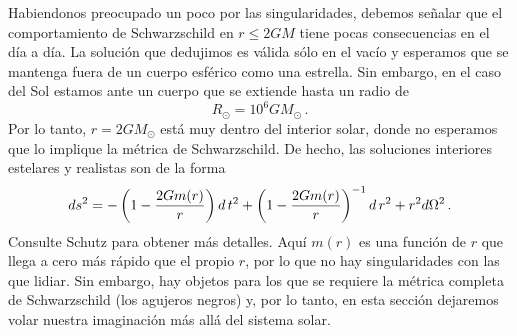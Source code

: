 \documentclass[11pt,b5paper,openany,twoside]{book}
\begin{document}
Habiendonos preocupado un poco por las singularidades, debemos señalar que el comportamiento de Schwarzschild en $r\leq 2GM$ tiene pocas consecuencias en el día a día.
La solución que dedujimos es válida sólo en el vacío y esperamos que se mantenga fuera de un cuerpo esférico como una estrella.
Sin embargo, en el caso del Sol estamos ante un cuerpo que se extiende hasta un radio de
\begin{equation}
R_\odot = 10^6 G M_\odot\,.\label{7.31}
\end{equation}
Por lo tanto, $r=2GM_\odot$ está muy dentro del interior solar, donde no esperamos que lo implique la métrica de Schwarzschild.
De hecho, las soluciones interiores estelares y realistas son de la forma
\begin{equation}
ds^2 = -\left(1-{{2Gm(r)}\over r}\right) d\,t^2 +
\left(1-{{2Gm(r)}\over r}\right)^{-1} d\,r^2
+ r^2 d\Omega^2\,.\label{7.32}
\end{equation}
Consulte Schutz para obtener más detalles.
Aquí $m(r)$ es una función de $r$ que llega a cero más rápido que el propio $r$, por lo que no hay singularidades con las que lidiar.
Sin embargo, hay objetos para los que se requiere la métrica completa de Schwarzschild (los agujeros negros) y, por lo tanto, en esta sección dejaremos volar nuestra imaginación más allá del sistema solar.
\end{document}
